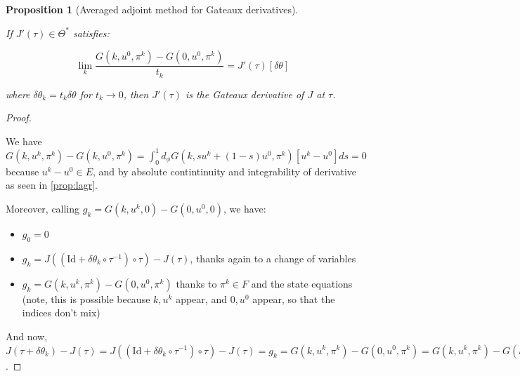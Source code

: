 \documentclass[english,a4paper,10pt,oneside]{scrbook}	%
\theoremstyle{break}
\newtheorem{prop}[equation]{Proposition}
\newenvironment{mproof}[1][\proofname]{%
  \begin{proof}[#1]$ $\par\nobreak\ignorespaces
}{%
  \end{proof}
}
\renewcommand*{\proofname}{Proof}
\theoremstyle{remark}
\newcommand{\id}{\text{Id}}
\newcommand{\te}{\theta}
\newcommand{\Te}{\Theta}
\begin{document}
\begin{prop}[Averaged adjoint method for Gateaux derivatives]
\label{prop:adv_adj}

If $J'(\tau) \in \Te^*$ satisfies:

$$\lim_{k}\frac{G(k,u^0,\pi^k)-G(0,u^0,\pi^k)}{t_k}=J'(\tau)[\delta \te]$$

where $\delta\te_k = t_k\delta \te$ for $t_k\rightarrow 0$, then $J'(\tau)$ is the Gateaux derivative of $J$ at $\tau$.

\end{prop}

\begin{mproof}

We have $G(k,u^k,\pi^k)-G(k,u^0,\pi^k)  = \int_0^1 d_\phi G(k, su^k + (1-s)u^0,\pi^k)[u^k-u^0]ds = 0$ because $u^k-u^0 \in E$, and by absolute contintinuity and integrability of derivative as seen in \cref{prop:lagr}.

Moreover, calling $g_k = G(k,u^k,0)-G(0,u^0,0)$, we have:

\begin{itemize}
	\item $g_0 = 0$
	\item $g_k = J((\id+\delta\te_k \circ \tau^{-1})\circ \tau)-J(\tau)$, thanks again to a change of variables
	\item $g_k = G(k,u^k,\pi^k)-G(0,u^0,\pi^k)$ thanks to $\pi^k \in F$ and the state equations (note, this is possible because $k,u^k$ appear, and $0,u^0$ appear, so that the indices don't mix)
\end{itemize}

And now, $J(\tau+\delta\te_k)-J(\tau) = J((\id+\delta\te_k \circ \tau^{-1})\circ \tau)-J(\tau) = g_k = G(k,u^k,\pi^k)-G(0,u^0,\pi^k) = G(k,u^k,\pi^k)-G(k,u^0,\pi^k)+G(k,u^0,\pi^k)-G(0,u^0,\pi^k) = G(k,u^0,\pi^k)-G(0,u^0,\pi^k)$.

\end{mproof}
\end{document}
